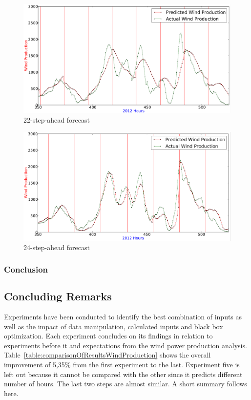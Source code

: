 \begin{figure}[H]
\centering
\includegraphics[width=0.99\linewidth]{billeder/best22vsbest24Ahead.png}
\caption{22-step-ahead forecast}
\label{fig:best22vsbest24Ahead}
\end{figure}

\begin{figure}[H]
\centering
\includegraphics[width=0.99\linewidth]{billeder/best24AheadPredictionWithLines.png}
\caption{24-step-ahead forecast}
\label{fig:best24AheadPredictionWithLines}
\end{figure} 

\subsubsection{Conclusion}

\subsection{Concluding Remarks}
Experiments have been conducted to identify the best combination of inputs as well as the impact of data manipulation, calculated inputs and black box optimization. Each experiment concludes on its findings in relation to experiments before it and expectations from the wind power production analysis. Table~\ref{table:comparisonOfResultsWindProduction} shows the overall improvement of 5,35\% from the first experiment to the last. Experiment five is left out because it cannot be compared with the other since it predicts different number of hours. The last two steps are almost similar. A short summary follows here. 

